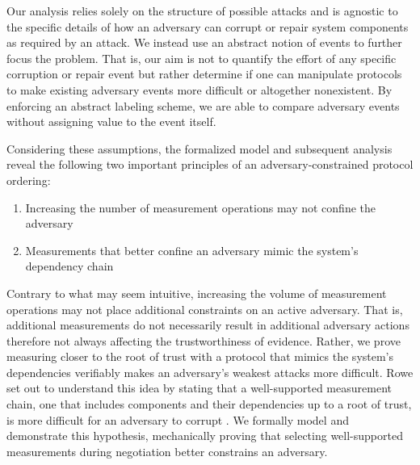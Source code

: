 \documentclass[runningheads]{llncs}
\theoremstyle{definition}
\newcommand{\squash}{\itemsep=0pt\parskip=0pt}
\begin{document}
Our analysis relies solely on the structure of possible attacks and is agnostic to the specific details of how an adversary can corrupt or repair system components as required by an attack. We instead use an abstract notion of events to further focus the problem. That is, our aim is not to quantify the effort of any specific corruption or repair event but rather determine if one can manipulate protocols to make existing adversary events more difficult or altogether nonexistent. By enforcing an abstract labeling scheme, we are able to compare adversary events without assigning value to the event itself.

Considering these assumptions, the formalized model and subsequent analysis reveal the following two important principles of an adversary-constrained protocol ordering:  

\begin{enumerate}
    \item Increasing the number of measurement operations may not confine the adversary 
    \item Measurements that better confine an adversary mimic the system's dependency chain 
\end{enumerate}

\noindent Contrary to what may seem intuitive, increasing the volume of measurement operations may not place additional constraints on an active adversary. That is, additional measurements do not necessarily result in additional adversary actions therefore not always affecting the  trustworthiness of evidence. Rather, we prove measuring closer to the root of trust with a protocol that mimics the system's dependencies verifiably makes an adversary's weakest attacks more difficult. Rowe set out to understand this idea by stating that a well-supported measurement chain, one that includes components and their dependencies up to a root of trust, is more difficult for an adversary to corrupt \cite{Rowe:2016:Confining}. We formally model and demonstrate this hypothesis, mechanically proving that selecting well-supported measurements during negotiation better constrains an adversary.


\end{document}
